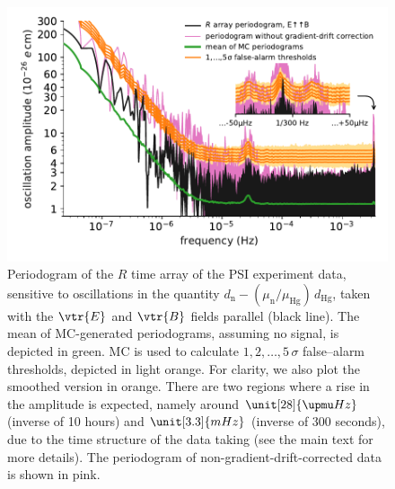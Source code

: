 \begin{figure}
  \centering
  \includegraphics[width=\columnwidth]{gfx/axions/detection_psi_inset_gc.pdf}
  \caption{
  Periodogram of the $R$ time array of the PSI experiment data, sensitive to oscillations in the quantity $d_\mathrm{n} - \left( \mu_\mathrm{n} / \mu_\textrm{Hg} \right) \, d_\textrm{Hg}$, taken with the $\vtr{E}$ and $\vtr{B}$ fields parallel (black line).
  The mean of MC-generated periodograms, assuming no signal, is depicted in green. MC is used to calculate $1,2,…,5\,\sigma$ false--alarm thresholds, depicted in light orange.
  For clarity, we also plot the smoothed version in orange.
  There are two regions where a rise in the amplitude is expected, namely around $\unit[28]{\upmu Hz}$ (inverse of 10 hours) and $\unit[3.3]{mHz}$ (inverse of 300 seconds), due to the time structure of the data taking (see the main text for more details). The periodogram of non-gradient-drift-corrected data is shown in pink.
  }\label{fig:PSI_detection}
\end{figure}

